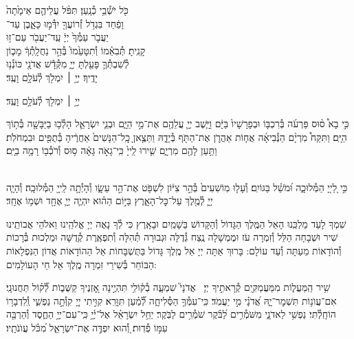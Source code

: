 \documentclass[twoside, openany, parskip=half, 11pt]{book}
\begin{document}
כֹּ֖ל יֹשְׁ֯בֵ֥י כְ֯נָֽעַן׃ \hfill תִּפֹּ֨ל עֲלֵיהֶ֤ם אֵימָ֙תָה֙ \\
וָפַ֔חַד \hfill בִּגְדֹ֥ל זְ֯רוֹעֲךָ֖ יִדְּ֯מ֣וּ כָּאָ֑בֶן \hfill עַד־\\
יַעֲבֹ֤ר עַמְּ֯ךָ֙ יְיָ֔ \hfill עַֽד־יַעֲבֹ֖ר עַם־ז֥וּ \\
קָנִֽיתָ׃ \hfill תְּ֯בִאֵ֗מוֹ וְ֯תִטָּעֵ֙מוֹ֙ בְּ֯הַ֣ר נַחֲלָֽתְ֯ךָ֔ \hfill מָכ֧וֹן \\
לְ֯שִׁבְתְּ֯ךָ֛ פָּעַ֖לְתָּ יְיָ֑ \hfill מִקְּ֯דָ֕שׁ אֲדֹנָ֖י כּוֹנְ֯נ֥וּ \\
יָדֶֽיךָ׃ \hfill יְיָ֥ ׀ יִמְלֹ֖ךְ לְ֯עֹלָ֥ם וָעֶֽד׃\hfill \break
\begin{small}
יְיָ֥ ׀ יִמְלֹ֖ךְ לְ֯עֹלָ֥ם וָעֶֽד׃\\
\end{small}
\begin{small}
כִּ֣י בָא֩ ס֨וּס פַּרְעֹ֜ה בְּ֯רִכְבּ֤וֹ וּבְפָרָשָׁיו֙ בַּיָּ֔ם וַיָּ֧שֶׁב יְיָ֛ עֲלֵהֶ֖ם אֶת־מֵ֣י הַיָּ֑ם וּבְנֵ֧י יִשְׂרָאֵ֛ל הָלְ֯כ֥וּ בַיַּבָּשָׁ֖ה בְּ֯ת֥וֹךְ הַיָּֽם׃ וַתִּקַּח֩ מִרְיָ֨ם הַנְּ֯בִיאָ֜ה אֲח֧וֹת אַהֲרֹ֛ן אֶת־הַתֹּ֖ף בְּ֯יָדָ֑הּ וַתֵּצֶ֤אןָ כׇֽל־הַנָּשִׁים֙ אַחֲרֶ֔יהָ בְּ֯תֻפִּ֖ים וּבִמְחֹלֹֽת׃ וַתַּ֥עַן לָהֶ֖ם מִרְיָ֑ם שִׁ֤ירוּ לַֽייָ֙ כִּֽי־גָאֹ֣ה גָּאָ֔ה ס֥וּס וְ֯רֹכְ֯ב֖וֹ רָמָ֥ה בַיָּֽם׃\end{small}
\\
כִּ֣י לַ֭ייָ֭ הַמְּ֯לוּכָ֑ה וּ֝מֹשֵׁ֗ל בַּגּוֹיִֽם׃
וְ֯עָל֤וּ מֽוֹשִׁעִים֙ בְּ֯הַ֣ר צִיּ֔וֹן לִשְׁפֹּ֖ט אֶת־הַ֣ר עֵשָׂ֑ו וְ֯הָיְ֯תָ֥ה לַֽייָ֖ הַמְּ֯לוּכָֽה׃
וְ֯הָיָ֧ה יְיָ֛ לְ֯מֶ֖לֶךְ עַל־כׇּל־הָאָ֑רֶץ בַּיּ֣וֹם הַה֗וּא יִהְיֶ֧ה יְיָ֛ אֶחָ֖ד וּשְׁמ֥וֹ אֶחָֽד׃


שִׁמְךָ לָעַד מַלְכֵּֽנוּ הָאֵל הַמֶּֽלֶךְ הַגָּדוֹל וְ֯הַקָּדוֹשׁ בַּשָׁמַֽיִם וּבָאָֽרֶץ כִּי לְ֯ךָ נָאֶה יְיָ אֱלֹהֵֽינוּ וֵאלֹהֵי אֲבוֹתֵֽינוּ שִׁיר וּשְׁבָחָה הַלֵּל וְ֯זִמְרָה עֹז וּמֶמְשָׁלָה נֶֽצַח גְּ֯דֻלָּה וּגְבוּרָה תְּ֯הִלָּה וְ֯תִפְאֶֽרֶת קְ֯דֻשָּׁה וּמַלְכוּת בְּ֯רָכוֹת וְ֯הוֹדָאוֹת מֵעַתָּה וְ֯עַד עוֹלָם: בָּרוּךְ אַתָּה יְיָ אֵל מֶֽלֶךְ גָּדוֹל בַּתֻּשְׁבָּחוֹת אֵל הַהוֹדָאוֹת אֲדוֹן הַנִּפְלָאוֹת הַבּוֹחֵר בְּ֯שִׁירֵי זִמְרָה מֶֽלֶךְ אֵל חֵי הָעוֹלָמִים:
\newcommand{\mimaamakim}{
\begin{sometimes}

שִׁ֥יר הַֽמַּעֲל֑וֹת מִמַּעֲמַקִּ֖ים קְ֯רָאתִ֣יךָ יְיָ׃\ \break
אֲדֹנָי֮ שִׁמְעָ֢ה בְ֯ק֫וֹלִ֥י תִּהְיֶ֣ינָה אׇ֭זְנֶיךָ קַשֻּׁב֑וֹת לְ֯֝ק֗וֹל תַּחֲנוּנָֽי׃\hfill \break
אִם־עֲוֺנ֥וֹת תִּשְׁמׇר־יָ֑הּ אֲ֝דֹנָ֗י מִ֣י יַעֲמֹֽד׃\hfill \break
כִּֽי־עִמְּ֯ךָ֥ הַסְּ֯לִיחָ֑ה לְ֯֝מַ֗עַן תִּוָּרֵֽא׃\hfill \break
קִוִּ֣יתִי יְיָ֭ קִוְּ֯תָ֣ה נַפְשִׁ֑י וְֽ֯לִדְבָר֥וֹ הוֹחָֽלְ֯תִּי׃\hfill \break
נַפְשִׁ֥י לַאדֹנָ֑י מִשֹּׁמְ֯רִ֥ים לַ֝בֹּ֗קֶר שֹׁמְ֯רִ֥ים לַבֹּֽקֶר׃\hfill \break
יַחֵ֥ל יִשְׂרָאֵ֗ל אֶל־יְ֫יָ֥ כִּֽי־עִם־יְיָ֥ הַחֶ֑סֶד וְ֯הַרְבֵּ֖ה עִמּ֣וֹ פְ֯דֽוּת׃\hfill \break
וְ֭֯הוּא יִפְדֶּ֣ה אֶת־יִשְׂרָאֵ֑ל מִ֝כֹּ֗ל עֲוֺנֹתָֽיו׃ \hfill \break
\end{sometimes}
}
\\
\mimaamakim
\\
\halfkaddish
\end{document}
